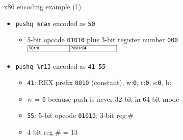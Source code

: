 
\begin{frame}[fragile,label=x86ex1]{x86 encoding example (1)}
    \begin{itemize}
    \item \lstinline|pushq %rax| encoded as {\tt 50}
        \begin{itemize}
        \item 5-bit opcode {\tt 01010} plus 3-bit register number {\tt 000} \\
        \includegraphics[width=0.4\textwidth]{../x8664-encoding/intel-manual-push-ex1}
        \end{itemize}
    \item \lstinline|pushq %r13| encoded as {\tt 41 55}
        \begin{itemize}
        \item {\tt 41}: REX prefix {\tt 0010} (constant), w:{\tt 0}, r:{\tt 0}, s:{\tt 0}, b:{\tt \color{blue!80!black}{1}}
        \item w = {\tt 0} because push is never 32-bit in 64-bit mode
        \item {\tt 55}: 5-bit opcode {\tt 01010}; 3-bit reg \# {\tt \color{green!80!black}{101}}
        \item 4-bit reg \# {\tt \color{blue!80!black}{1}\color{green!80!black}{101}} = 13
        \end{itemize}
    \end{itemize}
\end{frame}

